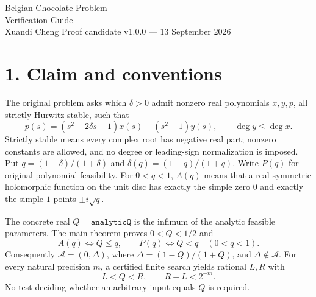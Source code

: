 \documentclass[10pt,a4paper]{article}
\begin{document}
{\LARGE\color{ink}Belgian Chocolate Problem}\\[4pt]
{\Large Verification Guide}\\[5pt]
Xuandi Cheng \hfill Proof candidate v1.0.0 --- 13 September 2026

\section*{1. Claim and conventions}
The original problem asks which $\delta>0$ admit nonzero real polynomials
$x,y,p$, all strictly Hurwitz stable, such that
\[
p(s)=(s^2-2\delta s+1)x(s)+(s^2-1)y(s),\qquad \deg y\le\deg x.
\]
Strictly stable means every complex root has negative real part;
nonzero constants are allowed, and no degree or leading-sign normalization
is imposed. Put $q=(1-\delta)/(1+\delta)$ and
$\delta(q)=(1-q)/(1+q)$. Write $P(q)$ for original polynomial feasibility.
For $0<q<1$, $A(q)$ means that a real-symmetric holomorphic function on the
unit disc has exactly the simple zero $0$ and exactly the simple $1$-points
$\pm i\sqrt q$.

The concrete real $Q=\texttt{analyticQ}$ is the infimum of the analytic
feasible parameters. The main theorem proves $0<Q<1/2$ and
\[
 A(q)\iff Q\le q,\qquad P(q)\iff Q<q\quad(0<q<1).
\]
Consequently $\mathcal A=(0,\Delta)$, where $\Delta=(1-Q)/(1+Q)$, and
$\Delta\notin\mathcal A$. For every natural precision $m$, a certified
finite search yields rational $L,R$ with
\[
L<Q<R,\qquad R-L<2^{-m}.
\]
No test deciding whether an arbitrary input equals $Q$ is required.
\end{document}
